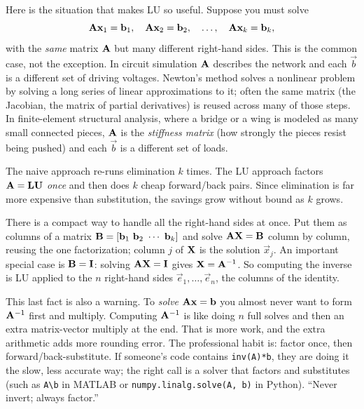Here is the situation that makes LU so useful. Suppose you must solve
\[
  \mathbf{A}\mathbf{x}_1 = \mathbf{b}_1,\quad \mathbf{A}\mathbf{x}_2 = \mathbf{b}_2,\quad \dots,\quad
  \mathbf{A}\mathbf{x}_k = \mathbf{b}_k,
\]
with the \emph{same} matrix $\mathbf{A}$ but many different right-hand sides. This is the
common case, not the exception. In circuit simulation $\mathbf{A}$ describes the network and each
$\vec{b}$ is a different set of driving voltages. Newton's method solves a nonlinear problem
by solving a long series of linear approximations to it; often the same matrix (the
Jacobian, the matrix of partial derivatives) is reused across many of those steps. In
finite-element structural analysis, where a bridge or a wing is modeled as many small
connected pieces, $\mathbf{A}$ is the \emph{stiffness matrix} (how strongly the pieces resist
being pushed) and each $\vec{b}$ is a different set of loads.

The naive approach re-runs elimination $k$ times. The LU approach factors
$\mathbf{A}=\mathbf{L}\mathbf{U}$ \emph{once} and then does $k$ cheap forward/back pairs. Since
elimination is far more expensive than substitution, the savings grow without bound as $k$
grows.

There is a compact way to handle all the right-hand sides at once. Put them as columns of
a matrix $\mat{B}=[\vec{b}_1\ \vec{b}_2\ \cdots\ \vec{b}_k]$ and solve $\mathbf{A}\mathbf{X}=\mathbf{B}$
column by column, reusing the one factorization; column $j$ of $\mathbf{X}$ is the solution
$\vec{x}_j$. An important special case is
$\mathbf{B}=\mathbf{I}$: solving $\mathbf{A}\mathbf{X}=\mathbf{I}$ gives $\mathbf{X}=\mathbf{A}^{-1}$. So computing
the inverse is LU applied to the $n$ right-hand sides $\vec{e}_1,\dots,\vec{e}_n$, the
columns of the identity.

\begin{trapbox}
This last fact is also a warning. To \emph{solve} $\mathbf{A}\mathbf{x}=\mathbf{b}$ you almost never
want to form $\mathbf{A}^{-1}$ first and multiply. Computing $\mathbf{A}^{-1}$ is like doing $n$ full
solves and then an extra matrix-vector multiply at the end. That is more work, and the
extra arithmetic adds more rounding error. The professional habit is: factor once, then
forward/back-substitute. If someone's code contains \texttt{inv(A)*b}, they are doing it the
slow, less accurate way; the right call is a solver that factors and substitutes (such as
\texttt{A\textbackslash b} in MATLAB or \texttt{numpy.linalg.solve(A, b)} in Python).
``Never invert; always factor.''
\end{trapbox}

